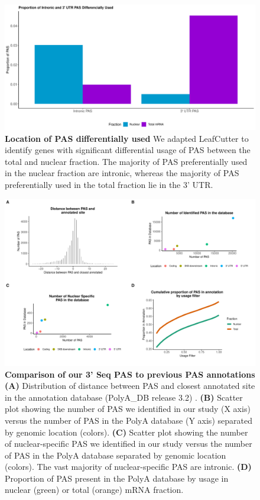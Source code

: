 \begin{figure}[!htb]
\centering \includegraphics[width=5in]{img/ch02/Fig1_figuresupplement5.pdf}
\caption[Location of PAS differentially used]{\textbf{Location of PAS differentially used} We adapted LeafCutter to identify genes with significant differential usage of PAS between the total and nuclear fraction. The majority of PAS preferentially used in the nuclear fraction are intronic, whereas the majority of PAS preferentially used in the total fraction lie in the 3' UTR. }
\label{fig:locdPAS}
\end{figure}
\clearpage


\begin{figure}[!htb]
\centering \includegraphics[width=5in]{img/ch02/Fig1_figuresupplement6.pdf}
\caption[Comparison of our 3'-Seq PAS to previous PAS annotations]{\textbf{Comparison of our 3' Seq PAS to previous PAS annotations} {\bf (A)} Distribution of distance between PAS and closest annotated site in the annotation database (PolyA\_DB release 3.2) \citep{wang_polya_db_2018}. {\bf (B)} Scatter plot showing the number of PAS we identified in our study (X axis) versus the number of PAS in the PolyA database (Y axis) separated by genomic location (colors). {\bf (C)} Scatter plot showing the number of nuclear-specific PAS we identified in our study versus the number of PAS in the PolyA database separated by genomic location (colors). The vast majority of nuclear-specific PAS are intronic. {\bf (D)} Proportion of PAS present in the PolyA database by usage in nuclear (green) or total (orange) mRNA fraction.}
\label{fig:compAnno}
\end{figure}
\clearpage


